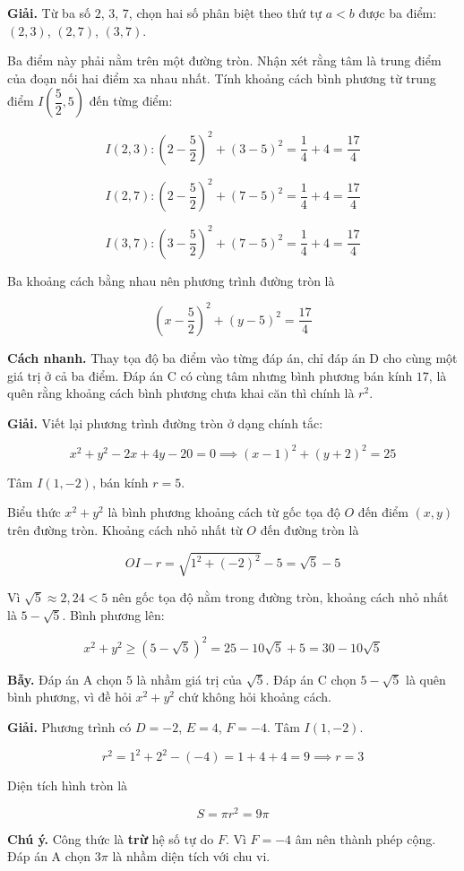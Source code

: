 \documentclass[11pt, a4paper]{article}
\begin{document}
\begin{dapan}[9 — Đáp án D]
\textbf{Giải.} Từ ba số $2$, $3$, $7$, chọn hai số phân biệt theo thứ tự $a < b$ được ba điểm: $(2,3)$, $(2,7)$, $(3,7)$.

Ba điểm này phải nằm trên một đường tròn. Nhận xét rằng tâm là trung điểm của đoạn nối hai điểm xa nhau nhất. Tính khoảng cách bình phương từ trung điểm $I\left(\dfrac{5}{2}, 5\right)$ đến từng điểm:

$$I(2,3): \left(2 - \frac{5}{2}\right)^2 + (3-5)^2 = \frac{1}{4} + 4 = \frac{17}{4}$$

$$I(2,7): \left(2 - \frac{5}{2}\right)^2 + (7-5)^2 = \frac{1}{4} + 4 = \frac{17}{4}$$

$$I(3,7): \left(3 - \frac{5}{2}\right)^2 + (7-5)^2 = \frac{1}{4} + 4 = \frac{17}{4}$$

Ba khoảng cách bằng nhau nên phương trình đường tròn là

$$\left(x - \frac{5}{2}\right)^2 + (y - 5)^2 = \frac{17}{4}$$

\textbf{Cách nhanh.} Thay tọa độ ba điểm vào từng đáp án, chỉ đáp án D cho cùng một giá trị ở cả ba điểm. Đáp án C có cùng tâm nhưng bình phương bán kính $17$, là quên rằng khoảng cách bình phương chưa khai căn thì chính là $r^2$.
\end{dapan}

\begin{dapan}[10 — Đáp án B]
\textbf{Giải.} Viết lại phương trình đường tròn ở dạng chính tắc:

$$x^2 + y^2 - 2x + 4y - 20 = 0 \implies (x-1)^2 + (y+2)^2 = 25$$

Tâm $I(1, -2)$, bán kính $r = 5$.

Biểu thức $x^2 + y^2$ là bình phương khoảng cách từ gốc tọa độ $O$ đến điểm $(x,y)$ trên đường tròn. Khoảng cách nhỏ nhất từ $O$ đến đường tròn là

$$OI - r = \sqrt{1^2 + (-2)^2} - 5 = \sqrt{5} - 5$$

Vì $\sqrt{5} \approx 2{,}24 < 5$ nên gốc tọa độ nằm trong đường tròn, khoảng cách nhỏ nhất là $5 - \sqrt{5}$. Bình phương lên:

$$x^2 + y^2 \ge (5 - \sqrt{5})^2 = 25 - 10\sqrt{5} + 5 = 30 - 10\sqrt{5}$$

\textbf{Bẫy.} Đáp án A chọn $5$ là nhầm giá trị của $\sqrt{5}$. Đáp án C chọn $5 - \sqrt{5}$ là quên bình phương, vì đề hỏi $x^2 + y^2$ chứ không hỏi khoảng cách.
\end{dapan}

\begin{dapan}[11 — Đáp án C]
\textbf{Giải.} Phương trình có $D = -2$, $E = 4$, $F = -4$. Tâm $I(1, -2)$.

$$r^2 = 1^2 + 2^2 - (-4) = 1 + 4 + 4 = 9 \implies r = 3$$

Diện tích hình tròn là

$$S = \pi r^2 = 9\pi$$

\textbf{Chú ý.} Công thức là \textbf{trừ} hệ số tự do $F$. Vì $F = -4$ âm nên thành phép cộng. Đáp án A chọn $3\pi$ là nhầm diện tích với chu vi.
\end{dapan}
\end{document}
